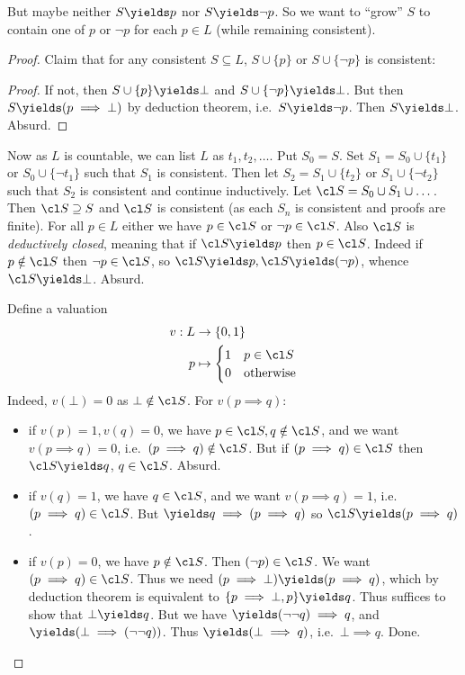 \documentclass[a4paper]{article}
\begin{document}
But maybe neither \(S \yields p\) nor \(S \yields \neg p\). So we want to ``grow'' \(S\) to contain one of \(p\) or \(\neg p\) for each \(p \in L\) (while remaining consistent).

\begin{proof}
  Claim that for any consistent \(S \subseteq L\), \(S \cup \{p\}\) or \(S \cup \{\neg p\}\) is consistent:

  \begin{proof}
    If not, then \(S \cup \{p\} \yields \bot\) and \(S \cup \{\neg p\} \yields \bot\). But then \(S \yields (p \implies \bot)\) by deduction theorem, i.e.\ \(S \yields \neg p\). Then \(S \yields \bot\). Absurd.
  \end{proof}

  Now as \(L\) is countable, we can list \(L\) as \(t_1, t_2, \dots \). Put \(S_0 = S\). Set \(S_1 = S_0 \cup \{t_1\}\) or \(S_0 \cup \{\neg t_1\}\) such that \(S_1\) is consistent. Then let \(S_2 = S_1 \cup \{t_2\}\) or \(S_1 \cup \{\neg t_2\}\) such that \(S_2\) is consistent and continue inductively. Let \(\cl S = S_0 \cup S_1 \cup \dots\). Then \(\cl S \supseteq S\) and \(\cl S\) is consistent (as each \(S_n\) is consistent and proofs are finite). For all \(p \in L\) either we have \(p \in \cl S\) or \(\neg p \in \cl S\). Also \(\cl S\) is \emph{deductively closed}, meaning that if \(\cl S \yields p\) then \(p \in \cl S\). Indeed if \(p \notin \cl S\) then \(\neg p \in \cl S\), so \(\cl S \yields p, \cl S \yields (\neg p)\), whence \(\cl S \yields \bot\). Absurd.

  Define a valuation
  \begin{align*}
    v: L &\to \{0, 1\} \\
    p &\mapsto
        \begin{cases}
          1 & p \in \cl S \\
          0 & \text{otherwise}
        \end{cases}
  \end{align*}
  Indeed, \(v(\bot) = 0\) as \(\bot \notin \cl S\). For \(v(p \implies q)\):
  \begin{itemize}
  \item if \(v(p) = 1, v(q) = 0\), we have \(p \in \cl S, q \notin \cl S\), and we want \(v(p \implies q) = 0\), i.e.\ \((p \implies q) \notin \cl S\). But if \((p \implies q) \in \cl S\) then \(\cl S \yields q\), \(q \in \cl S\). Absurd.
  \item if \(v(q) = 1\), we have \(q \in \cl S\), and we want \(v(p \implies q) = 1\), i.e.\ \((p \implies q) \in \cl S\). But \(\yields q \implies (p \implies q)\) so \(\cl S \yields (p \implies q)\).
  \item if \(v(p) = 0\), we have \(p \notin \cl S\). Then \((\neg p) \in \cl S\). We want \((p \implies q) \in \cl S\). Thus we need \((p \implies \bot) \yields (p \implies q)\), which by deduction theorem is equivalent to \(\{p \implies \bot, p\} \yields q\). Thus suffices to show that \(\bot \yields q\). But we have \(\yields (\neg \neg q) \implies q\), and \(\yields (\bot \implies (\neg \neg q))\). Thus \(\yields (\bot \implies q)\), i.e.\ \(\bot \implies q\). Done.
  \end{itemize}
\end{proof}
\end{document}
